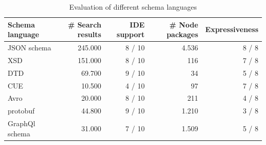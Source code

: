\documentclass[lettersize,journal]{IEEEtran}
\begin{document}
    
    \begin{table}[]
    \centering
    \caption{Evaluation of different schema languages\label{tab:all}}
        \begin{tabular}{@{}lrrrr@{}}
        \toprule
        \textbf{Schema language} &
          \textbf{\# Search results } &
          \textbf{IDE support} &
          \textbf{\# Node packages} &
          \textbf{Expressiveness} \\ \midrule
        JSON schema &
          245.000 &
          8 / 10 &
          4.536 & 8 / 8  \\
        XSD & 151.000 & 8 / 10 & 116 & 7 / 8 \\
        DTD & 69.700 & 9 / 10 & 34 & 5 / 8\\
        CUE & 10.500 & 4 / 10 & 97 & 7 / 8 \\
        Avro & 20.000 & 8 / 10 & 211 & 4 / 8 \\
        protobuf &  44.800 & 9 / 10 & 1.210 & 3 / 8\\
        GraphQl schema & 31.000 & 7 / 10 & 1.509 & 5 / 8\\ \bottomrule
        \end{tabular}
    \end{table}

\end{document}
